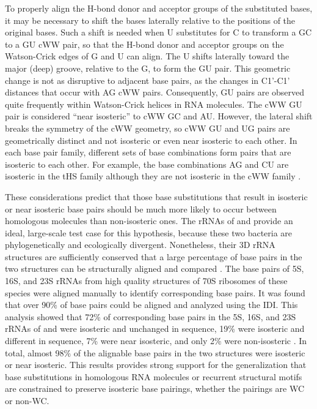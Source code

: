 To properly align the H-bond donor and acceptor groups of the substituted bases,
it may be necessary to shift the bases laterally relative to the positions of
the original bases. Such a shift is needed when U substitutes for C to transform
a GC to a GU cWW pair, so that the H-bond donor and acceptor groups on the
Watson-Crick edges of G and U can align. The U shifts laterally toward the major
(deep) groove, relative to the G, to form the GU pair. This geometric change is
not as disruptive to adjacent base pairs, as the changes in C1'-C1' distances
that occur with AG cWW pairs. Consequently, GU pairs are observed quite
frequently within Watson-Crick helices in RNA molecules. The cWW GU pair is
considered ``near isosteric'' to cWW GC and AU. However, the lateral shift breaks
the symmetry of the cWW geometry, so cWW GU and UG pairs are geometrically
distinct and not isosteric or even near isosteric to each other. In each base
pair family, different sets of base combinations form pairs that are isosteric
to each other. For example, the base combinations AG and CU are isosteric in the
tHS family although they are not isosteric in the cWW family \cite{Leontis2002f, Leontis1998b}.

These considerations predict that those base substitutions that result in
isosteric or near isosteric base pairs should be much more likely to occur
between homologous molecules than non-isosteric ones. The rRNAs of \EC{} and
\TT{} provide an ideal, large-scale test case for this hypothesis, because these
two bacteria are phylogenetically and ecologically divergent. Nonetheless, their
3D rRNA structures are sufficiently conserved that a large percentage of base
pairs in the two structures can be structurally aligned and compared
\cite{Stombaugh2009}. The base pairs of 5S, 16S, and 23S rRNAs from high quality
structures of 70S ribosomes of these species were aligned manually to identify
corresponding base pairs. It was found that over 90\% of base pairs could be
aligned and analyzed using the IDI. This analysis showed that 72\% of
corresponding base pairs in the 5S, 16S, and 23S rRNAs of \EC{} and \TT{} were
isosteric and unchanged in sequence, 19\% were isosteric and different in
sequence, 7\% were near isosteric, and only 2\% were non-isosteric
\cite{Stombaugh2009}. In total, almost 98\% of the alignable base pairs in the
two structures were isosteric or near isosteric. This results provides strong
support for the generalization that base substitutions in homologous RNA
molecules or recurrent structural motifs are constrained to preserve isosteric
base pairings, whether the pairings are WC or non-WC.


